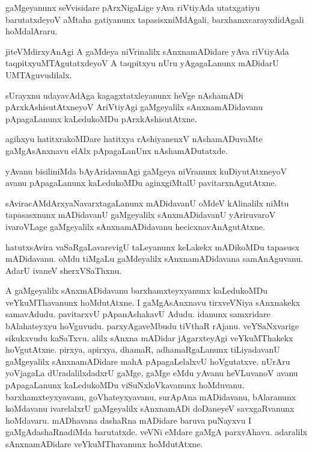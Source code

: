 \documentclass{article}
\begin{document}
\begin{mn}%
gaMgeyanunx seVvisidare pArxNigaLige yAva riVtiyAda utatxgatiyu barutatxdeyoV aMtaha gatiyanunx 
tapasisxniMdAgali, barxhamxcarayxdidAgali hoMdalAraru.
\end{mn}

\begin{mn}%
jiteVMdirxyAnAgi A gaMdeya niVrinalilx sAnxnamADidare yAva riVtiyAda taqpitxyuMTAgutatxdeyoV A 
taqpitxyu nUru yAgagaLanunx mADidarU UMTAguvudilalx. 
\end{mn}

\begin{mn}%
sUrayxnu udayavAdAga kagagxtatxleyanunx heVge nAshamADi pArxkAshisutAtxneyoV AriVtiyAgi gaMgeyalilx 
sAnxnamADidavanu pApagaLanunx kaLedukoMDu pArxkAshisutAtxne.
\end{mn}

\begin{mn}%
agihxyu hatitxrakoMDare hatitxya rAshiyanenxV nAshamADuvaMte gaMgAsAnxnavu elAlx pApagaLanUnx 
nAshamADutatxde.
\end{mn}

\begin{mn}%
yAvanu bisiliniMda bAyAridavanAgi gaMgeya niVranunx kuDiyutAtxneyoV avanu pApagaLanunx kaLedukoMDu 
aginxgiMtalU pavitarxnAgutAtxne.
\end{mn}

\begin{mn}%
sAviracAMdArxyaNavarxtagaLanunx mADidavanU oMdeV kAlinalilx niMtu tapasasxnunx mADidavanU 
gaMgeyalilx sAnxmADidavanU yAriruvaroV ivaroVLage gaMgeyalilx sAnxnamADidavanu hecicxnavAnAgutAtxne.
\end{mn}

\begin{mn}%
hatutxsAvira vaSaRgaLavarevigU taLeyanunx keLakekx mADikoMDu tapasusx mADidavanu. oMdu tiMgaLu 
gaMdeyalilx sAnxnamADidavana samAnAguvanu. AdarU ivaneV sherxVSaThxnu.
\end{mn}

\begin{mn}%
A gaMgeyalilx sAnxmADidavanu barxhamxteyxyanunx kaLedukoMDu veYkuMThavanunx hoMdutAtxne. I 
gaMgAsAnxnavu tirxveVNiya sAnxnakekx samavAdudu. pavitarxvU pApanAshakavU Adudu. idanunx 
samxridare bAlahateyxyu hoVguvudu. parxyAgaveMbudu tiVthaR rAjanu. veYSaNxvarige sikukxvudu 
kaSaTxvu. alilx sAnxna mADidar jAgarxteyAgi veYkuMThakekx hoVgutAtxne. pirxya, apirxya, dhamaR, 
adhamaRgaLanunx tiLiyadavanU gaMgeyalilx sAnxnamADidare mahA pApagaLelalxvU hoVgutatxve. nUrAru 
yoVjagaLa dUradalilxdadxrU gaMge, gaMge eMdu yAvanu heVLuvanoV avanu pApagaLanunx kaLedukoMDu 
viSuNxloVkavanunx hoMduvanu. barxhamxteyxyavanu, goVhateyxyavanu, surApAna mADidavanu, bAlaranunx 
koMdavanu ivarelalxrU gaMgeyalilx sAnxnamADi doDaneyeV savxgaRvanunx hoMdavaru. mADhavana dashaRna 
mADidare baruva puNayxvu I gaMgAdashaRnadiMda barutatxde. veVNi eMdare gaMgA parxvAhavu. adaralilx 
sAnxnamADidare veYkuMThavanunx hoMdutAtxne.
\end{mn}
\end{document}
